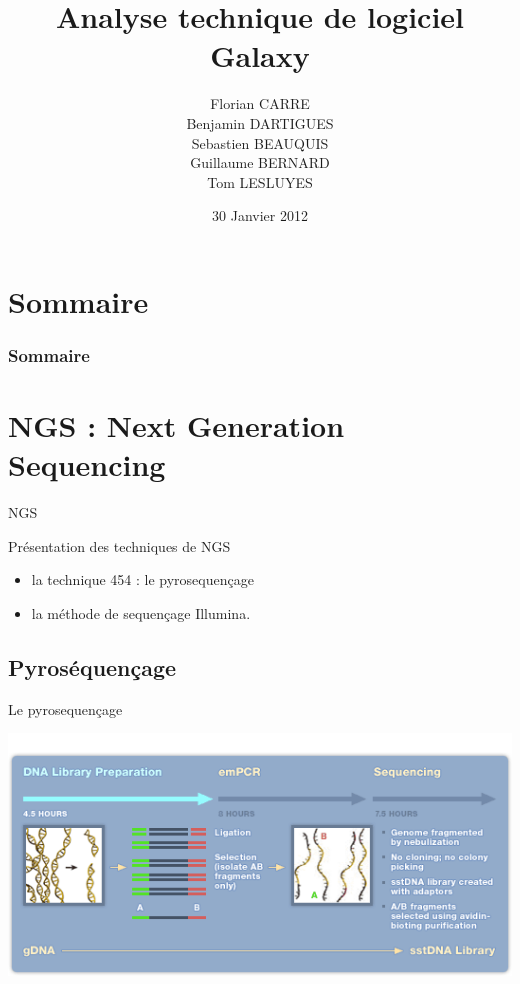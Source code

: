 \documentclass[12pt]{beamer}
\title[Galaxy]{Analyse technique de logiciel\\ Galaxy}
\author[F. C. | B. D. | S. B. | G. B. | T. L.]{Florian CARRE\\Benjamin DARTIGUES\\Sebastien BEAUQUIS\\Guillaume BERNARD\\Tom LESLUYES}
\date{30 Janvier 2012}
\institute[]{Université de Bordeaux 1}
\begin{document}
\maketitle

\section*{Sommaire}
\begin{frame}
\frametitle{Sommaire}
\tableofcontents[pausesections]
\end{frame}


\section{NGS : Next Generation Sequencing}
\begin{frame}{NGS}
\begin{block}{Présentation des techniques de NGS}
\begin{itemize}
 \item la technique 454 : le pyrosequençage
\item la méthode de sequençage Illumina.
\end{itemize}
\end{block}
\end{frame}

\subsection{Pyroséquençage}
\begin{frame}{Le pyrosequençage}
\begin{center}
\includegraphics[scale=0.6]{./img/seq1.png}
\end{center}
\end{frame}
\end{document}
